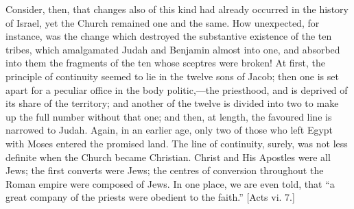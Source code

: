 Consider, then, that changes also of this kind had already occurred
in the history of Israel, yet the Church remained one and the same.
How unexpected, for instance, was the change which destroyed the
substantive existence of the ten tribes, which amalgamated Judah and
Benjamin almost into one, and absorbed into them the fragments of the
ten whose sceptres were broken! At first, the principle of continuity
seemed to lie in the twelve sons of Jacob; then one is set apart for a
peculiar office in the body politic,—the priesthood, and is deprived
of its share of the territory; and another of the twelve is divided
into two to make up the full number without that one; and then, at
length, the favoured line is narrowed to Judah. Again, in an earlier
age, only two of those who left Egypt with Moses entered the promised
land. The line of continuity, surely, was not less definite when the
Church became Christian. Christ and His Apostles were all Jews; the
first converts were Jews; the centres of conversion throughout the
Roman empire were composed of Jews. In one place, we are even told,
that ``a great company of the priests were obedient to the
faith.'' [Acts vi. 7.]

